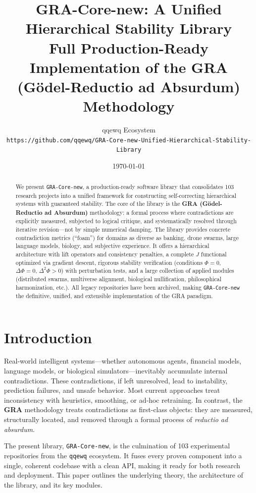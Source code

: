 \documentclass[11pt,a4paper]{article}
\title{\textbf{GRA-Core-new: A Unified Hierarchical Stability Library}\\[3mm]
\large Full Production-Ready Implementation of the GRA (Gödel-Reductio ad Absurdum) Methodology}
\author{qqewq Ecosystem \\
\texttt{https://github.com/qqewq/GRA-Core-new-Unified-Hierarchical-Stability-Library}}
\date{\today}
\begin{document}
\maketitle

\begin{abstract}
We present \texttt{GRA-Core-new}, a production-ready software library that consolidates 103 research projects into a unified framework for constructing self-correcting hierarchical systems with guaranteed stability. The core of the library is the \textbf{GRA (Gödel-Reductio ad Absurdum)} methodology: a formal process where contradictions are explicitly measured, subjected to logical critique, and systematically resolved through iterative revision—not by simple numerical damping. The library provides concrete contradiction metrics (“foam”) for domains as diverse as banking, drone swarms, large language models, biology, and subjective experience. It offers a hierarchical architecture with lift operators and consistency penalties, a complete $J$ functional optimized via gradient descent, rigorous stability verification (conditions $\Phi=0$, $\Delta\Phi=0$, $\Delta^2\Phi>0$) with perturbation tests, and a large collection of applied modules (distributed swarms, multiverse alignment, biological nullification, philosophical harmonization, etc.). All legacy repositories have been archived, making \texttt{GRA-Core-new} the definitive, unified, and extensible implementation of the GRA paradigm.
\end{abstract}

\section{Introduction}
Real-world intelligent systems—whether autonomous agents, financial models, language models, or biological simulators—inevitably accumulate internal contradictions. These contradictions, if left unresolved, lead to instability, prediction failures, and unsafe behavior. Most current approaches treat inconsistency with heuristics, smoothing, or ad‑hoc retraining. In contrast, the \textbf{GRA} methodology treats contradictions as first-class objects: they are measured, structurally located, and removed through a formal process of \textit{reductio ad absurdum}.

The present library, \texttt{GRA-Core-new}, is the culmination of 103 experimental repositories from the \texttt{qqewq} ecosystem. It fuses every proven component into a single, coherent codebase with a clean API, making it ready for both research and deployment. This paper outlines the underlying theory, the architecture of the library, and its key modules.
\end{document}
